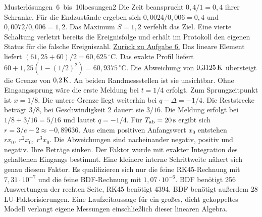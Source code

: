 \unit{Musterlösungen 6 bis 10}{loesungen2}
\hypertarget{loes6}{}
Die Zeit beansprucht \(0{,}4/1=0{,}4\) ihrer Schranke. Für die Endzustände ergeben sich \(0{,}0024/0{,}006=0{,}4\) und \(0{,}0072/0{,}006=1{,}2\). Das Maximum \(S=1{,}2\) verfehlt das Ziel. Eine vierte Schaltung verletzt bereits die Ereignisfolge und erhält im Protokoll den eigenen Status für die falsche Ereigniszahl. \hyperlink{aufgabe6}{Zurück zu Aufgabe 6.}
\hypertarget{loes7}{}
Das lineare Element liefert \((61{,}25+60)/2=60{,}625\,^\circ\mathrm C\). Das exakte Profil liefert \(60+1{,}25(1-(1/2)^2)=60{,}9375\,^\circ\mathrm C\). Die Abweichung von \(0{,}3125\,\mathrm{K}\) übersteigt die Grenze von \(0{,}2\,\mathrm{K}\). An beiden Randmessstellen ist sie unsichtbar.
\hypertarget{loes8}{}
Ohne Eingangssprung wäre die erste Meldung bei \(t=1/4\) erfolgt. Zum Sprungzeitpunkt ist \(x=1/8\). Die untere Grenze liegt weiterhin bei \(q-\Delta=-1/4\). Die Reststrecke beträgt \(3/8\), bei Geschwindigkeit 2 dauert sie \(3/16\). Die Meldung erfolgt bei \(1/8+3/16=5/16\) und lautet \(q=-1/4\).
\hypertarget{loes9}{}
Für \(T_{\rm ab}=20\,\mathrm{s}\) ergibt sich \(r=3/e-2\approx-0{,}89636\). Aus einem positiven Anfangswert \(x_0\) entstehen \(rx_0,\ r^2x_0,\ r^3x_0\). Die Abweichungen sind nacheinander negativ, positiv und negativ. Ihre Beträge sinken. Der Faktor wurde mit exakter Integration des gehaltenen Eingangs bestimmt. Eine kleinere interne Schrittweite nähert sich genau diesem Faktor.
\hypertarget{loes10}{}
Es qualifizieren sich nur die feine RK45-Rechnung mit \(7{,}31\cdot10^{-7}\) und die feine BDF-Rechnung mit \(1{,}07\cdot10^{-6}\). BDF benötigt 256 Auswertungen der rechten Seite, RK45 benötigt 4394. BDF benötigt außerdem 28 LU-Faktorisierungen. Eine Laufzeitaussage für ein großes, dicht gekoppeltes Modell verlangt eigene Messungen einschließlich dieser linearen Algebra.

